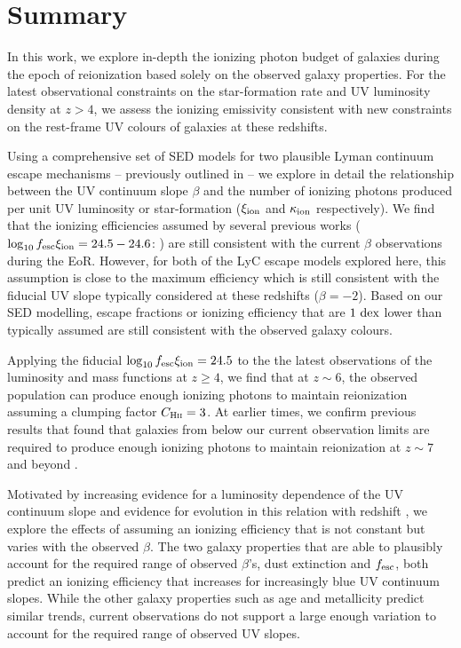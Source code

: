 \section{Summary}\label{reion-sec:summary}
In this work, we explore in-depth the ionizing photon budget of galaxies during the epoch of reionization based solely on the observed galaxy properties. For the latest observational constraints on the star-formation rate and UV luminosity density at $z > 4$, we assess the ionizing emissivity consistent with new constraints on the rest-frame UV colours of galaxies at these redshifts.

Using a comprehensive set of SED models for two plausible Lyman continuum escape mechanisms -- previously outlined in \citet{Zackrisson:2013iz} -- we explore in detail the relationship between the UV continuum slope $\beta$ and the number of ionizing photons produced per unit UV luminosity or star-formation ($\xi_{\rm{ion}}$ and $\kappa_{\rm{ion}}$ respectively). We find that the ionizing efficiencies assumed by several previous works ($\log_{10} f_{\rm{esc}}\xi_{\rm{ion}} = 24.5-24.6$: \citet{Robertson:2013ji,Kuhlen:2012ka}) are still consistent with the current $\beta$ observations during the EoR. However, for both of the LyC escape models explored here, this assumption is close to the maximum efficiency which is still consistent with the fiducial UV slope typically considered at these redshifts ($\beta = -2$). Based on our SED modelling, escape fractions or ionizing efficiency that are $1~\rm{dex}$ lower than typically assumed are still consistent with the observed galaxy colours.

Applying the fiducial $\log_{10} f_{\rm{esc}}\xi_{\rm{ion}} = 24.5$ to the the latest observations of the luminosity and mass functions at $z\geq4$, we find that at $z\sim6$, the observed population can produce enough ionizing photons to maintain reionization assuming a clumping factor $C_{\textsc{Hii}} = 3$. At earlier times, we confirm previous results that found that galaxies from below our current observation limits are required to produce enough ionizing photons to maintain reionization at $z\sim7$ and beyond \citep{2010Natur.468...49R,Robertson:2013ji,Kuhlen:2012ka,Finkelstein:2012hr}.

Motivated by increasing evidence for a luminosity dependence of the UV continuum slope  \citep{Bouwens:2013vf,Rogers:2014bn} and evidence for evolution in this relation with redshift \citep{Bouwens:2013vf}, we explore the effects of assuming an ionizing efficiency that is not constant but varies with the observed $\beta$. The two galaxy properties that are able to plausibly account for the required range of observed $\beta$'s, dust extinction and $f_{\rm{esc}}$, both predict an ionizing efficiency that increases for increasingly blue UV continuum slopes. While the other galaxy properties such as age and metallicity predict similar trends, current observations do not support a large enough variation to account for the required range of observed UV slopes.

